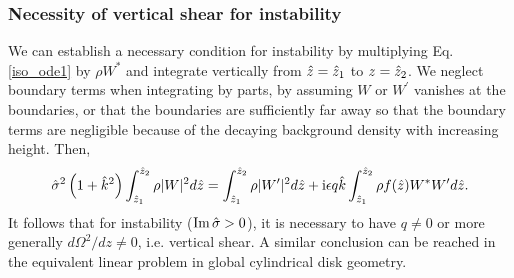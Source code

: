\subsubsection{Necessity of vertical shear for
  instability}\label{integral_relation} 
We can establish a necessary condition for instability by multiplying
Eq. \ref{iso_ode1} by $\rho W^*$ and integrate vertically from
$\hat{z}=\hat{z}_1$ to $z=\hat{z}_2$. We neglect boundary 
terms when integrating by parts, by assuming $W$ or
$W^\prime$ vanishes at the boundaries, or that the boundaries are 
sufficiently far away so that the boundary terms are negligible because of the
decaying background density with increasing height. Then,
\begin{align}
  \hat{\sigma}^2\left(1+\hat{k}^2\right)\int_{\hat{z}_1}^{\hat{z}_2}\rho|W|^2d\hat{z}
  =\int_{\hat{z}_1}^{\hat{z}_2}\rho|W^\prime|^2d\hat{z} 
  +\mathrm{i} \epsilon q \hat{k}\int_{\hat{z}_1}^{\hat{z}_2}\rho f(\hat{z}) W^*W^\prime d\hat{z}.\label{integral_relation1}
\end{align}
It follows that for instability ($\operatorname{Im}\hat{\sigma}>0$), it is necessary to
have $q\neq0$ or more generally $d\Omega^2/dz\neq 0$, i.e. vertical
shear. A similar conclusion can be reached in the equivalent linear  
problem in global cylindrical disk geometry. 

